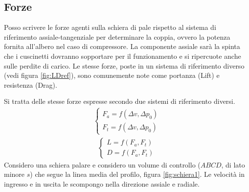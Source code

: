 \subsection{Forze}
Posso scrivere le forze agenti sulla schiera di pale rispetto al sistema di riferimento assiale-tangenziale per determinare la coppia, ovvero la potenza fornita all'albero nel caso di compressore. La componente assiale sarà la spinta che i cuscinetti dovranno sopportare per il funzionamento e si ripercuote anche sulle perdite di carico. Le stesse forze, poste in un sistema di riferimento diverso (vedi figura \ref{fig:LDref}), sono comunemente note come portanza (Lift) e resistenza (Drag).

Si tratta delle stesse forze espresse secondo due sistemi di riferimento diversi. 
\begin{align*}
	\begin{cases}
		F_a = f(\Delta v, \Delta p_0)\\
		F_t = f(\Delta v, \Delta p_0)
	\end{cases}
\end{align*}
\begin{align*}
	\begin{cases}
		L = f(F_a,F_t)\\
		D = f(F_a,F_t)
	\end{cases}
\end{align*}
Considero una schiera palare e considero un volume di controllo ($ABCD$, di lato minore $s$) che segue la linea media del profilo, figura \ref{fig:schiera1}. Le velocità in ingresso e in uscita le scompongo nella direzione assiale e radiale. 
